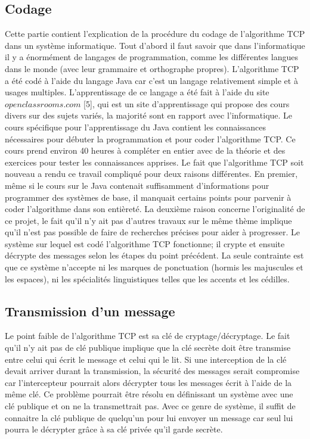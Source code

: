 \documentclass[a4paper,12pt]{report}
\begin{document}
     \subsection{Codage}
	Cette partie contient l'explication de la procédure du codage de l'algorithme TCP dans un système informatique. Tout d'abord il faut savoir que dans l'informatique il y a énormément de langages de programmation, comme les différentes langues dans le monde (avec leur grammaire et orthographe propres). L'algorithme TCP a été codé à l'aide du langage Java car c'est un langage relativement simple et à usages multiples. L'apprentissage de ce langage a été fait à l'aide du site $openclassrooms.com$ [5], qui est un site d'apprentissage qui propose des cours divers sur des sujets variés, la majorité sont en rapport avec l'informatique. \newline 
	Le cours spécifique pour l'apprentissage du Java contient les connaissances nécessaires pour débuter la programmation et pour coder l'algorithme TCP. Ce cours prend environ 40 heures à compléter en entier avec de la théorie et des exercices pour tester les connaissances apprises. Le fait que l'algorithme TCP soit nouveau a rendu ce travail compliqué pour deux raisons différentes. En premier, même si le cours sur le Java contenait suffisamment d'informa\-tions pour programmer des systèmes de base, il manquait certains points pour parvenir à coder l'algorithme dans son entièreté. La deuxième raison concerne l'originalité de ce projet, le fait qu'il n'y ait pas d'autres travaux sur le même thème implique qu'il n'est pas possible de faire de recherches précises pour aider à progresser. \newline
	Le système sur lequel est codé l'algorithme TCP fonctionne; il crypte et ensuite décrypte des messages selon les étapes du point précédent. La seule contrainte est que ce système n'accepte ni les marques de ponctuation (hormis les majuscules et les espaces), ni les spécialités linguistiques telles que les accents et les cédilles.
	
	\subsection{Transmission d'un message}
	Le point faible de l'algorithme TCP est sa clé de cryptage/décryptage. Le fait qu'il n'y ait pas de clé publique implique que la clé secrète doit être transmise entre celui qui écrit le message et celui qui le lit. Si une interception de la clé devait arriver durant la transmission, la sécurité des messages serait compromise car l'intercepteur pourrait alors décrypter tous les messages écrit à l'aide de la même clé. Ce problème pourrait être résolu en définissant un système avec une clé publique et on ne la transmettrait pas. Avec ce genre de système, il suffit de connaitre la clé publique de quelqu'un pour lui envoyer un message car seul lui pourra le décrypter grâce à sa clé privée qu'il garde secrète.
     
\end{document}
